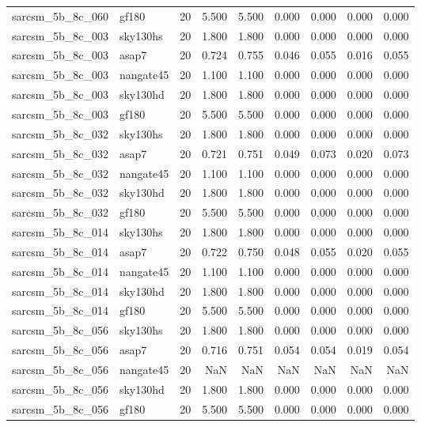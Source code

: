 \begin{tabular}{llrrrrrrr}
sarcsm\_5b\_8c\_060 & gf180 & 20 & 5.500 & 5.500 & 0.000 & 0.000 & 0.000 & 0.000 \\
sarcsm\_5b\_8c\_003 & sky130hs & 20 & 1.800 & 1.800 & 0.000 & 0.000 & 0.000 & 0.000 \\
sarcsm\_5b\_8c\_003 & asap7 & 20 & 0.724 & 0.755 & 0.046 & 0.055 & 0.016 & 0.055 \\
sarcsm\_5b\_8c\_003 & nangate45 & 20 & 1.100 & 1.100 & 0.000 & 0.000 & 0.000 & 0.000 \\
sarcsm\_5b\_8c\_003 & sky130hd & 20 & 1.800 & 1.800 & 0.000 & 0.000 & 0.000 & 0.000 \\
sarcsm\_5b\_8c\_003 & gf180 & 20 & 5.500 & 5.500 & 0.000 & 0.000 & 0.000 & 0.000 \\
sarcsm\_5b\_8c\_032 & sky130hs & 20 & 1.800 & 1.800 & 0.000 & 0.000 & 0.000 & 0.000 \\
sarcsm\_5b\_8c\_032 & asap7 & 20 & 0.721 & 0.751 & 0.049 & 0.073 & 0.020 & 0.073 \\
sarcsm\_5b\_8c\_032 & nangate45 & 20 & 1.100 & 1.100 & 0.000 & 0.000 & 0.000 & 0.000 \\
sarcsm\_5b\_8c\_032 & sky130hd & 20 & 1.800 & 1.800 & 0.000 & 0.000 & 0.000 & 0.000 \\
sarcsm\_5b\_8c\_032 & gf180 & 20 & 5.500 & 5.500 & 0.000 & 0.000 & 0.000 & 0.000 \\
sarcsm\_5b\_8c\_014 & sky130hs & 20 & 1.800 & 1.800 & 0.000 & 0.000 & 0.000 & 0.000 \\
sarcsm\_5b\_8c\_014 & asap7 & 20 & 0.722 & 0.750 & 0.048 & 0.055 & 0.020 & 0.055 \\
sarcsm\_5b\_8c\_014 & nangate45 & 20 & 1.100 & 1.100 & 0.000 & 0.000 & 0.000 & 0.000 \\
sarcsm\_5b\_8c\_014 & sky130hd & 20 & 1.800 & 1.800 & 0.000 & 0.000 & 0.000 & 0.000 \\
sarcsm\_5b\_8c\_014 & gf180 & 20 & 5.500 & 5.500 & 0.000 & 0.000 & 0.000 & 0.000 \\
sarcsm\_5b\_8c\_056 & sky130hs & 20 & 1.800 & 1.800 & 0.000 & 0.000 & 0.000 & 0.000 \\
sarcsm\_5b\_8c\_056 & asap7 & 20 & 0.716 & 0.751 & 0.054 & 0.054 & 0.019 & 0.054 \\
sarcsm\_5b\_8c\_056 & nangate45 & 20 & NaN & NaN & NaN & NaN & NaN & NaN \\
sarcsm\_5b\_8c\_056 & sky130hd & 20 & 1.800 & 1.800 & 0.000 & 0.000 & 0.000 & 0.000 \\
sarcsm\_5b\_8c\_056 & gf180 & 20 & 5.500 & 5.500 & 0.000 & 0.000 & 0.000 & 0.000 \\

\end{tabular}
